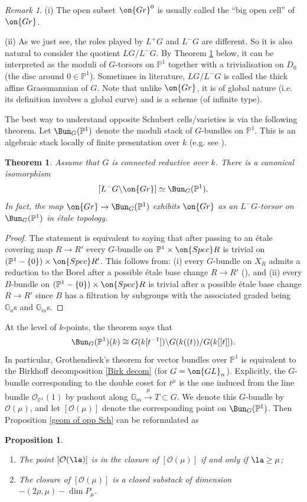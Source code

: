 \documentclass[]{pcmi}
\theoremstyle{plain}
\newtheorem{thm}[equation]{Theorem}
\newtheorem{prop}[equation]{Proposition}
\theoremstyle{remark}
\newtheorem{rmk}[equation]{Remark}
\theoremstyle{definition}
\newcommand{\bG}{{\mathbb G}}
\newcommand{\bP}{{\mathbb P}}
\newcommand{\mO}{{\mathcal O}}
\newcommand{\Gr}{{\on{Gr}}}
\newcommand{\Spec}{\on{Spec}}
\newcommand{\GL}{{\on{GL}}}
\begin{document}
\begin{rmk} (i) The open subset $\Gr^0$ is usually called the ``big open cell'' of $\Gr$.

(ii) As we just see, the roles played by $L^+G$ and $L^-G$ are different. So it is also natural to consider the quotient $LG/L^-G$. By Theorem \ref{uniformization for P1} below, it can be interpreted as the moduli of $G$-torsors on $\bP^1$ together with a trivialisation on $D_0$ (the disc around $0\in \bP^1$). Sometimes in literature, $LG/L^-G$ is called the thick affine Grassmannian of $G$. Note that unlike $\Gr$, it is of global nature (i.e. its definition involves a global curve) and is a scheme (of infinite type).  
\end{rmk}



The best way to understand opposite Schubert cells/varieties is via the following theorem. Let $\Bun_G(\bP^1)$ denote the moduli stack of $G$-bundles on $\bP^1$. This is an algebraic stack locally of finite presentation over $k$ (e.g. see \cite{So}).

\begin{thm}\label{uniformization for P1}
Assume that $G$ is connected reductive over $k$. There is a canonical isomorphism 
\[ [L^-G\backslash \Gr]\simeq \Bun_G(\bP^1).\]
In fact, the map $\Gr\to \Bun_G(\bP^1)$ exhibits $\Gr$ as an $L^-G$-torsor on $\Bun_G(\bP^1)$ in \'etale topology.
\end{thm}
\begin{proof}
The statement is equivalent to saying that after passing to an \'etale covering map $R\to R'$ every $G$-bundle on $\bP^1\times \Spec R$ is trivial on $(\bP^1-\{0\})\times \Spec R'$. This follows from: (i) every $G$-bundle on $X_R$ admits a reduction to the Borel after a possible \'etale base change $R\to R'$ (\cite[Theorem 1]{DS}), and (ii) every $B$-bundle on $(\bP^1-\{0\})\times \Spec R$ is trivial after a possible \'etale base change $R\to R'$ since $B$ has a filtration by subgroups with the associated graded being $\bG_a$s and $\bG_m$s.
\end{proof}

At the level of $k$-points, the theorem says that
\[ \Bun_{G}(\bP^1)(k)\cong G(k[t^{-1}])\backslash G(k((t))/ G(k[[t]]).\]
In particular, Grothendieck's theorem for vector bundles over $\bP^1$ is equivalent to the Birkhoff decomposition \eqref{Birk decom} (for $G=\GL_n$).
Explicitly, the $G$-bundle corresponding to the double coset for $t^\mu$ is the one induced from the line bundle $\mO_{\bP^1}(1)$ by pushout along $\bG_m\stackrel{\mu}{\to}T\subset G$. We denote this $G$-bundle by $\mO(\mu)$, and let $[\mO(\mu)]$ denote the corresponding point on $\Bun_G(\bP^1)$.
Then Proposition \ref{geom of opp Sch} can be reformulated as
\begin{prop}\label{geom of strata}~
\begin{enumerate}
\item The point $[\mO(\la)]$ is in the closure of $[\mO(\mu)]$ if and only if $\la\geq \mu$; 
\item The closure of $[\mO(\mu)]$ is a closed substack of dimension $-(2\rho,\mu)-\dim P_\mu$.
\end{enumerate}
\end{prop}
\end{document}
